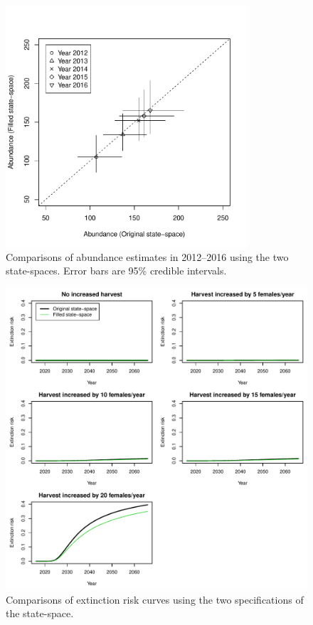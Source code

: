 \documentclass[12pt]{article}
\begin{document}
\begin{figure}[h]
  \centering
  \includegraphics[width=0.8\textwidth]{figs/N_SS1vSS2} 
  \caption{Comparisons of abundance estimates in 2012--2016 using the
    two state-spaces. Error bars are 95\% credible intervals.}
  \label{fig:N}
\end{figure}




\begin{figure}[h]
  \centering
  \includegraphics[width=\textwidth]{figs/EX_SS1vSS2} 
  \caption{Comparisons of extinction risk curves using the
    two specifications of the state-space.}
  \label{fig:EX}
\end{figure}
\end{document}
